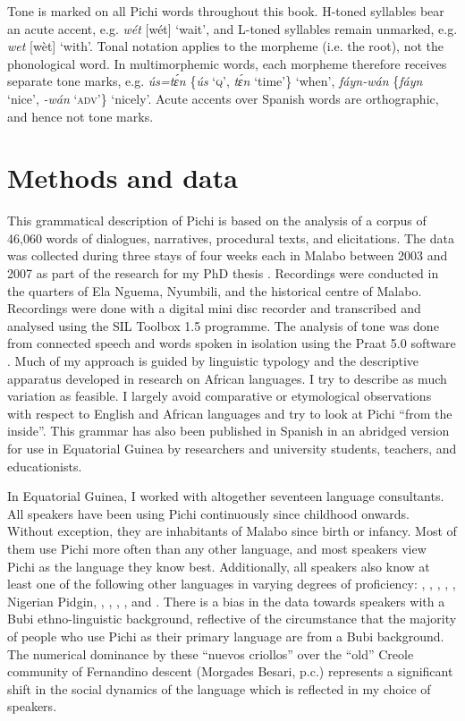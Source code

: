 Tone is marked on all Pichi words throughout this book. H-toned syllables bear an acute accent, e.g. \textit{wét} [wét] ‘wait’, and L-toned syllables remain unmarked, e.g. \textit{wet} [wèt] ‘with’. Tonal notation applies to the morpheme (i.e. the root), not the phonological word. In multimorphemic words, each morpheme therefore receives separate tone marks, e.g. \textit{ús=tɛ́n} \{\textit{\'us} ‘\textsc{q}’, \textit{tɛ́n} ‘time’\} ‘when’, \textit{fáyn-wán} \{\textit{fáyn} ‘nice’, \textit{-wán} ‘\textsc{adv}’\} ‘nicely’. Acute accents over Spanish words are orthographic, and hence not tone marks.


\section{Methods and data}\label{sec:1.7}

This grammatical description of Pichi is based on the analysis of a corpus of 46,060 words of dialogues, narratives, procedural texts, and elicitations. The data was collected during three stays of four weeks each in Malabo between 2003 and 2007 as part of the research for my PhD thesis \citep{Yakpo2009a}. Recordings were conducted in the quarters of Ela Nguema, Nyumbili, and the historical centre of Malabo. Recordings were done with a digital mini disc recorder and transcribed and analysed using the SIL Toolbox 1.5 programme. The analysis of tone was done from connected speech and words spoken in isolation using the Praat 5.0 software \citep{boersma2008}. Much of my approach is guided by linguistic typology and the descriptive apparatus developed in research on African languages. I try to describe as much variation as feasible. I largely avoid comparative or etymological observations with respect to English and African languages and try to look at Pichi “from the inside”. This grammar has also been published in Spanish \citep{Yakpo2010} in an abridged version for use in Equatorial Guinea by researchers and university students, teachers, and educationists. 


In Equatorial Guinea, I worked with altogether seventeen language consultants. All speakers have been using Pichi continuously since childhood onwards. Without exception, they are inhabitants of Malabo since birth or infancy. Most of them use Pichi more often than any other language, and most speakers view Pichi as the language they know best. Additionally, all speakers also know at least one of the following other languages in varying degrees of proficiency: , , , , , Nigerian Pidgin, , , , , and . There is a bias in the data towards speakers with a Bubi ethno-linguistic background, reflective of the circumstance that the majority of people who use Pichi as their primary language are from a Bubi background. The numerical dominance by these “nuevos criollos” over the “old” Creole community of Fernandino descent (Morgades Besari, p.c.) represents a significant shift in the social dynamics of the language which is reflected in my choice of speakers. 



